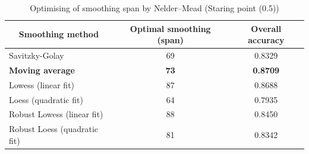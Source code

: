 

\begin{table}[t]
	\centering
	\caption{Optimising of smoothing span by Nelder–Mead (Staring point (0.5))}
	\label{table:Optimising_of_smoothing}
	\begin{tabular}{|l|c|c|}
		\hline
		\multicolumn{1}{|c|}{\textbf{Smoothing method}} & \textbf{Optimal smoothing (span)} & \textbf{Overall accuracy} \\ \hline
		Savitzky-Golay                                  & 69                            & 0.8329                    \\ \hline
		\textbf{Moving average}                         & \textbf{73}                   & \textbf{0.8709}           \\ \hline
		Lowess (linear fit)                             & 87                           & 0.8688                      \\ \hline
		Loess (quadratic fit)                           & 64                           & 0.7935                    \\ \hline
		Robust Lowess (linear fit)                      & 88                         & 0.8450                    \\ \hline
		Robust Loess (quadratic fit)                    & 81                        & 0.8342                    \\ \hline
	\end{tabular}
\end{table}


